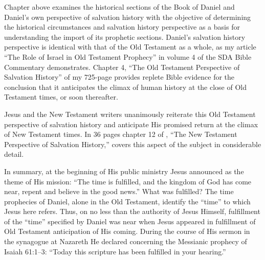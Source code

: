 Chapter  above examines the historical sections of the Book of Daniel and
Daniel's own perspective of salvation history with the objective of
determining the historical circumstances and salvation history perspective
as a basis for understanding the import of its prophetic sections. Daniel's
salvation history perspective is identical with that of the Old Testament as
a whole, as my article ``The Role of Israel in Old Testament 
Prophecy'' in
volume 4 of the SDA Bible Commentary demonstrates. Chapter 4, ``The Old Testament
Perspective of Salvation History'' of my 725-page 
provides replete Bible evidence for the
conclusion that it anticipates the climax of human history at the close of
Old Testament times, or soon thereafter.

Jesus and the New Testament writers unanimously reiterate this Old Testament
perspective of salvation history and anticipate His promised return at the
climax of New Testament times. In 36 pages chapter 12 of ,
``The New Testament Perspective of Salvation History,'' covers this
aspect of the subject in considerable detail.

In summary, at the beginning of His public ministry Jesus announced as the
theme of His mission: ``The time is fulfilled, and the kingdom of God has
come near, repent and believe in the good news.'' What was fulfilled? The
time prophecies of Daniel, alone in the Old Testament, identify the ``time''
to which Jesus here refers. Thus, on no less than the authority of Jesus
Himself, fulfillment of the ``time'' specified by Daniel was near when Jesus
appeared in fulfillment of Old Testament anticipation of His coming. During
the course of His sermon in the synagogue at Nazareth He declared concerning
the Messianic prophecy of Isaiah 61:1--3: ``Today this scripture has been
fulfilled in your hearing.''

